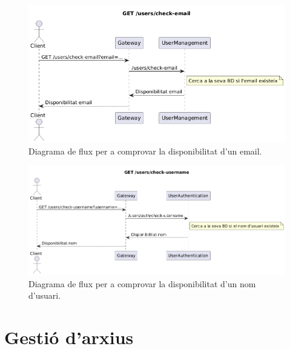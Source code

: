 \begin{figure}[H]
    \centering
    \includegraphics[width=1\textwidth]{Figures/flux/check_email.png}
    \caption{Diagrama de flux per a comprovar la disponibilitat d'un email.}
    \label{fig:flow_check_email}
\end{figure}

\begin{figure}[H]
    \centering
    \includegraphics[width=1\textwidth]{Figures/flux/check_username.png}
    \caption{Diagrama de flux per a comprovar la disponibilitat d'un nom d'usuari.}
    \label{fig:flow_check_username}
\end{figure}

\section{Gestió d'arxius}


